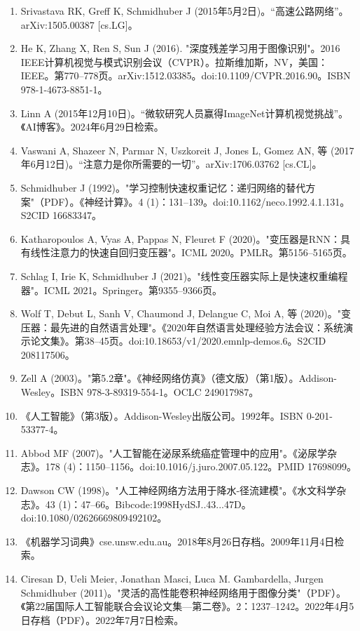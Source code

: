 \begin{enumerate}
\item Srivastava RK, Greff K, Schmidhuber J (2015年5月2日)。“高速公路网络”。arXiv:1505.00387 [cs.LG]。
\item He K, Zhang X, Ren S, Sun J (2016). "深度残差学习用于图像识别"。2016 IEEE计算机视觉与模式识别会议（CVPR）。拉斯维加斯，NV，美国：IEEE。第770–778页。arXiv:1512.03385。doi:10.1109/CVPR.2016.90。ISBN 978-1-4673-8851-1。
\item Linn A (2015年12月10日)。“微软研究人员赢得ImageNet计算机视觉挑战”。《AI博客》。2024年6月29日检索。
\item Vaswani A, Shazeer N, Parmar N, Uszkoreit J, Jones L, Gomez AN, 等 (2017年6月12日)。“注意力是你所需要的一切”。arXiv:1706.03762 [cs.CL]。
\item Schmidhuber J (1992)。"学习控制快速权重记忆：递归网络的替代方案"（PDF）。《神经计算》。4 (1)：131–139。doi:10.1162/neco.1992.4.1.131。S2CID 16683347。
\item Katharopoulos A, Vyas A, Pappas N, Fleuret F (2020)。"变压器是RNN：具有线性注意力的快速自回归变压器"。ICML 2020。PMLR。第5156–5165页。
\item Schlag I, Irie K, Schmidhuber J (2021)。"线性变压器实际上是快速权重编程器"。ICML 2021。Springer。第9355–9366页。
\item Wolf T, Debut L, Sanh V, Chaumond J, Delangue C, Moi A, 等 (2020)。"变压器：最先进的自然语言处理"。《2020年自然语言处理经验方法会议：系统演示论文集》。第38–45页。doi:10.18653/v1/2020.emnlp-demos.6。S2CID 208117506。
\item Zell A (2003)。"第5.2章"。《神经网络仿真》（德文版）（第1版）。Addison-Wesley。ISBN 978-3-89319-554-1。OCLC 249017987。
\item 《人工智能》（第3版）。Addison-Wesley出版公司。1992年。ISBN 0-201-53377-4。
\item Abbod MF (2007)。"人工智能在泌尿系统癌症管理中的应用"。《泌尿学杂志》。178 (4)：1150–1156。doi:10.1016/j.juro.2007.05.122。PMID 17698099。
\item Dawson CW (1998)。"人工神经网络方法用于降水-径流建模"。《水文科学杂志》。43 (1)：47–66。Bibcode:1998HydSJ..43...47D。doi:10.1080/02626669809492102。
\item 《机器学习词典》cse.unsw.edu.au。2018年8月26日存档。2009年11月4日检索。
\item Ciresan D, Ueli Meier, Jonathan Masci, Luca M. Gambardella, Jurgen Schmidhuber (2011)。"灵活的高性能卷积神经网络用于图像分类"（PDF）。《第22届国际人工智能联合会议论文集—第二卷》。2：1237–1242。2022年4月5日存档（PDF）。2022年7月7日检索。

\end{enumerate}
